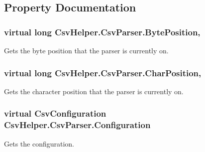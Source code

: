 \subsection{Property Documentation}
\hypertarget{a00048_a6fd7255ce9ae33029aafcaab07205047}{
\subsubsection[{Byte\-Position}]{\setlength{\rightskip}{0pt plus 5cm}virtual long Csv\-Helper.\-Csv\-Parser.\-Byte\-Position\hspace{0.3cm}{\ttfamily [get]}, {\ttfamily [set]}}}\label{a00048_a6fd7255ce9ae33029aafcaab07205047}


Gets the byte position that the parser is currently on. 

\hypertarget{a00048_a1e9b4aa434c3095d383e0c20b0c0b64c}{
\subsubsection[{Char\-Position}]{\setlength{\rightskip}{0pt plus 5cm}virtual long Csv\-Helper.\-Csv\-Parser.\-Char\-Position\hspace{0.3cm}{\ttfamily [get]}, {\ttfamily [set]}}}\label{a00048_a1e9b4aa434c3095d383e0c20b0c0b64c}


Gets the character position that the parser is currently on. 

\hypertarget{a00048_a417fc0dca5536811d7a8571ccdf0d46e}{
\subsubsection[{Configuration}]{\setlength{\rightskip}{0pt plus 5cm}virtual {\bf Csv\-Configuration} Csv\-Helper.\-Csv\-Parser.\-Configuration\hspace{0.3cm}{\ttfamily [get]}}}\label{a00048_a417fc0dca5536811d7a8571ccdf0d46e}


Gets the configuration. 

